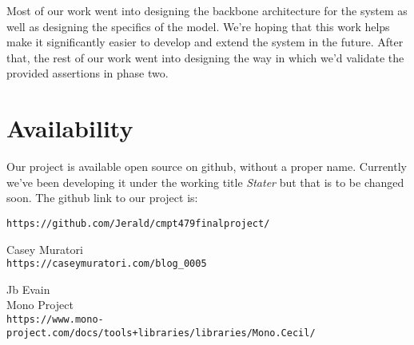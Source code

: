 \documentclass[letterpaper,twocolumn,10pt]{article}
\begin{document}
Most of our work went into designing the backbone architecture for the system as well as designing the specifics of the model. We're hoping that this work helps make it significantly easier to develop and extend the system in the future. After that, the rest of our work went into designing the way in which we'd validate the provided assertions in phase two.

\section{Availability}

Our project is available open source on github, without a proper name. Currently we've been developing it under the working title \textit{Stater} but that is to be changed soon. The github link to our project is:
\begin{center}
{\tt https://github.com/Jerald/cmpt479finalproject/}\\
\end{center}

\begin{thebibliography}{9}
    Casey Muratori\\
    \texttt{https://caseymuratori.com/blog\_0005}

    Jb Evain\\
    Mono Project\\
    \texttt{https://www.mono-project.com/docs/tools+libraries/libraries/Mono.Cecil/}
\end{thebibliography}






\theendnotes
\end{document}
